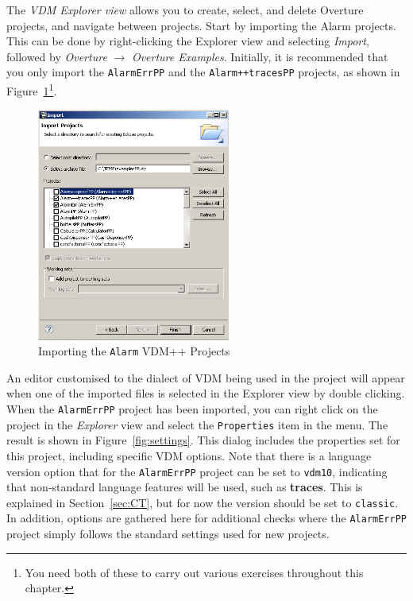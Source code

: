 The \emph{VDM Explorer view} allows you to create, select, and delete Overture projects, and navigate between projects.  Start by importing the Alarm projects.  This can be done by right-clicking the Explorer view and selecting \emph{Import}, followed by \emph{Overture} $\rightarrow$ \emph{Overture Examples}. Initially, it is recommended that you only import the \texttt{AlarmErrPP} and the \texttt{Alarm++tracesPP} projects, as shown in Figure~\ref{fig:importalarm}\footnote{You need both of these to carry out various exercises throughout this chapter.}.
%
\begin{figure}[!htb]
\begin{center}
  \includegraphics[width=2.5in]{figures/importalarmprofs}
  \caption[labelInTOC]{Importing the \texttt{Alarm} VDM++ Projects}
  \label{fig:importalarm}
\end{center}
\end{figure}
%
An editor customised to the dialect of VDM being used in the project will appear when one of the imported files is selected in the Explorer view by double clicking. When the
\texttt{AlarmErrPP} project has been imported, you can right click on the project in the \emph{Explorer} view and select the \texttt{Properties} item in the menu.  The result is shown in Figure~\ref{fig:settings}. This dialog includes the properties set for this project, including specific VDM options. Note that there is a language version option that for the \texttt{AlarmErrPP} project can be set to \texttt{vdm10}, indicating that non-standard language features will be used, such as {\bf\ttfamily traces}.  This is explained in Section~\ref{sec:CT}, but for now the version should be set to \texttt{classic}. In addition, options are gathered here for additional checks where the \texttt{AlarmErrPP} project simply follows the standard settings used for new projects.
